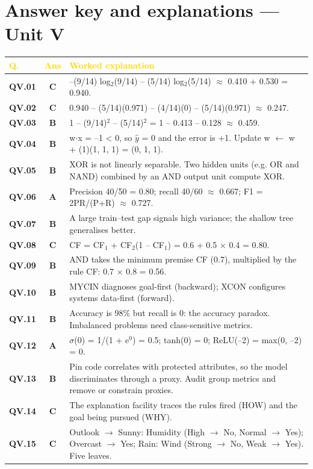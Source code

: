 \documentclass[11pt]{article}
\begin{document}
\section*{Answer key and explanations --- Unit V}
\begin{longtable}{>{\leavevmode\bfseries\color{navy}}p{1.3cm} c p{13.2cm}}
\rowcolor{navy}\textcolor{gold}{\textbf{Q.}}&\textcolor{gold}{\textbf{Ans}}&\textcolor{gold}{\textbf{Worked explanation}}\\\endhead
QV.01&\textbf{\color{leaf}C}&--(9/14) log$_2$(9/14) -- (5/14) log$_2$(5/14) $\approx$ 0.410 + 0.530 = 0.940.\\
\rowcolor{ivory}QV.02&\textbf{\color{leaf}C}&0.940 -- (5/14)(0.971) -- (4/14)(0) -- (5/14)(0.971) $\approx$ 0.247.\\
QV.03&\textbf{\color{leaf}B}&1 -- (9/14)$^2$ -- (5/14)$^2$ = 1 -- 0.413 -- 0.128 $\approx$ 0.459.\\
\rowcolor{ivory}QV.04&\textbf{\color{leaf}B}&w$\cdot$x = --1 < 0, so $\hat y$ = 0 and the error is +1. Update w $\leftarrow$ w + (1)(1, 1, 1) = (0, 1, 1).\\
QV.05&\textbf{\color{leaf}B}&XOR is not linearly separable. Two hidden units (e.g. OR and NAND) combined by an AND output unit compute XOR.\\
\rowcolor{ivory}QV.06&\textbf{\color{leaf}A}&Precision 40/50 = 0.80; recall 40/60 $\approx$ 0.667; F1 = 2PR/(P+R) $\approx$ 0.727.\\
QV.07&\textbf{\color{leaf}B}&A large train--test gap signals high variance; the shallow tree generalises better.\\
\rowcolor{ivory}QV.08&\textbf{\color{leaf}C}&CF = CF$_1$ + CF$_2$(1 -- CF$_1$) = 0.6 + 0.5 $\times$ 0.4 = 0.80.\\
QV.09&\textbf{\color{leaf}B}&AND takes the minimum premise CF (0.7), multiplied by the rule CF: 0.7 $\times$ 0.8 = 0.56.\\
\rowcolor{ivory}QV.10&\textbf{\color{leaf}B}&MYCIN diagnoses goal-first (backward); XCON configures systems data-first (forward).\\
QV.11&\textbf{\color{leaf}B}&Accuracy is 98\% but recall is 0: the accuracy paradox. Imbalanced problems need class-sensitive metrics.\\
\rowcolor{ivory}QV.12&\textbf{\color{leaf}A}&$\sigma$(0) = 1/(1 + e$^0$) = 0.5; tanh(0) = 0; ReLU(--2) = max(0, --2) = 0.\\
QV.13&\textbf{\color{leaf}B}&Pin code correlates with protected attributes, so the model discriminates through a proxy. Audit group metrics and remove or constrain proxies.\\
\rowcolor{ivory}QV.14&\textbf{\color{leaf}C}&The explanation facility traces the rules fired (HOW) and the goal being pursued (WHY).\\
QV.15&\textbf{\color{leaf}C}&Outlook $\to$ Sunny: Humidity (High $\to$ No, Normal $\to$ Yes); Overcast $\to$ Yes; Rain: Wind (Strong $\to$ No, Weak $\to$ Yes). Five leaves.\\
\end{longtable}
\newpage
\end{document}
